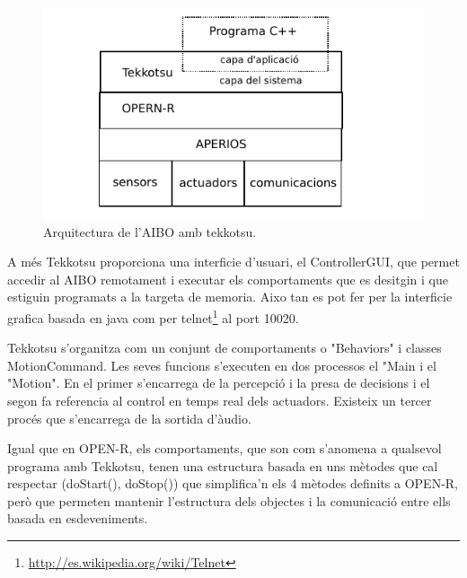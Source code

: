 \documentclass[12pt,a4paper,final,twoside]{article}
\begin{document}
\begin{figure}[h!]
	\centering
    \includegraphics[scale=1.2]{images/tekk.pdf}
	 \caption{Arquitectura de l'AIBO amb tekkotsu.}
  \label{fig:tekk}
\end{figure}

A més Tekkotsu proporciona una interficie d'usuari, el ControllerGUI, que permet accedir al AIBO remotament i executar els comportaments que es desitgin i que estiguin programats a la targeta de memoria. Aixo tan es pot fer per la interficie grafica basada en java com per telnet\footnote{\url{http://es.wikipedia.org/wiki/Telnet}} al port 10020\cite{TekkQuickRef}.

Tekkotsu s'organitza com un conjunt de comportaments o "Behaviors" i classes MotionCommand. Les seves funcions s'executen en dos processos el "Main i el "Motion". En el primer s'encarrega de la percepció i la presa de decisions i el segon fa referencia al control en temps real dels actuadors. Existeix un tercer procés que s'encarrega de la sortida d'àudio\cite{tekkTut}. 

Igual que en OPEN-R, els comportaments, que son com s'anomena a qualsevol programa amb Tekkotsu, tenen una estructura basada en uns mètodes que cal respectar (doStart(), doStop()) que simplifica'n els 4 mètodes definits a OPEN-R, però que permeten mantenir l'estructura dels objectes i la comunicació entre ells basada en esdeveniments.  
 
\end{document}
